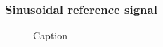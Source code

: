 \subsubsection{Sinusoidal reference signal}

\begin{figure}
    \centering
    
    \caption{Caption}
    \label{fig:my_label}
\end{figure}

